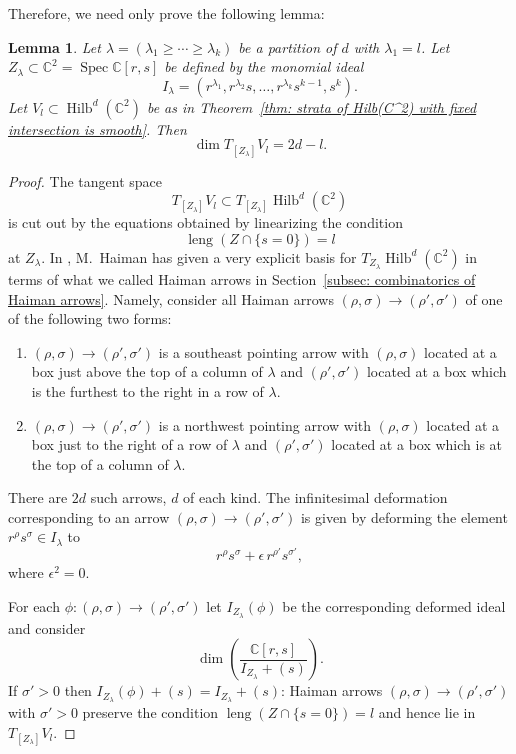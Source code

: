 \documentclass[12pt]{amsart}
\newtheorem{lemma}[theorem]{Lemma}
\theoremstyle{definition}
\newcommand{\CC} {\mathbb{C}}          %
\newcommand{\Hilb}{\operatorname{Hilb}}
\newcommand{\Spec}{\operatorname{Spec}}
\newcommand{\length}{\operatorname{leng}}
\begin{document}
Therefore, we need only prove the following lemma:
\begin{lemma}\label{lem: dim of Vl at Zlambda is 2d-l}
Let $\lambda =(\lambda_{1}\geq \dotsb \geq \lambda_{k})$ be a
partition of $d$ with $\lambda_{1}=l$. Let $Z_{\lambda}\subset
\CC^{2}=\Spec \CC [r,s]$ be defined by the monomial ideal
\[
I_{\lambda} = (r^{\lambda_{1}},r^{\lambda_{2}}s,\dotsc ,r^{\lambda_{k}}s^{k-1},s^{k}).
\]
Let $V_{l}\subset \Hilb^{d}(\CC^{2})$ be as in Theorem~\ref{thm:
strata of Hilb(C^2) with fixed intersection is smooth}. Then
\[
\dim T_{[Z_{\lambda}]}V_{l} = 2d-l.
\]
\end{lemma}
\begin{proof}
The tangent space
\[
T_{[Z_{\lambda}]}V_{l} \subset T_{[Z_{\lambda}]} \Hilb^{d}(\CC^{2})
\]
is cut out by the equations obtained by linearizing the condition
\[
\length (Z\cap \{s=0 \})=l
\]
at $Z_{\lambda}$. In
\cite{Haiman1998}, M.~Haiman has given a very explicit basis for
$T_{Z_{\lambda}}\Hilb^{d}(\CC^{2})$ in terms of what we called Haiman
arrows in Section~\ref{subsec: combinatorics of Haiman
arrows}. Namely, consider all Haiman arrows $(\rho ,\sigma )\to (\rho
',\sigma ')$ of one of the following two forms:
\begin{enumerate}
\item  $(\rho ,\sigma )\to (\rho ',\sigma ')$ is a southeast
pointing arrow with $(\rho ,\sigma )$ located at a box just above the
top of a column of $\lambda$ and $(\rho ',\sigma ')$ located at a box
which is the furthest to the right in a row of $\lambda$.
\item  $(\rho ,\sigma )\to (\rho ',\sigma ')$ is a northwest
pointing arrow with $(\rho ,\sigma )$ located at a box just to the
right of a row of $\lambda$ and  $(\rho ',\sigma ')$ located at a box
which is at the top of a column of $\lambda$.
\end{enumerate}
There are $2d$ such arrows, $d$ of each kind. The infinitesimal
deformation corresponding to an arrow $(\rho ,\sigma )\to (\rho
',\sigma ')$ is given by deforming the element $r^{\rho}s^{\sigma}\in
I_{\lambda}$ to
\[
r^{\rho}s^{\sigma}+\epsilon \, r^{\rho '}s^{\sigma '},
\]
where $\epsilon^{2}=0$.

For each $\phi :(\rho ,\sigma )\to (\rho ',\sigma ')$ let
$I_{Z_{\lambda}}(\phi )$ be the corresponding deformed ideal and
consider
\[
\dim \left(\frac{\CC [r,s] }{I_{Z_{\lambda}} + (s)} \right).
\]
If $\sigma '>0$ then $I_{Z_{\lambda}}(\phi ) + (s) =
I_{Z_{\lambda}} + (s)$: Haiman arrows $(\rho ,\sigma )\to (\rho
',\sigma ')$ with $\sigma '>0$ preserve the condition $\length (Z\cap
\{s=0 \})=l$ and hence lie in $T_{[Z_{\lambda}]}V_{l}$.


\end{proof}
\end{document}
